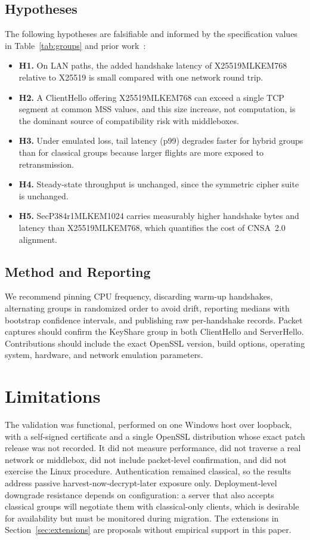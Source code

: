 \documentclass[conference]{IEEEtran}
\begin{document}
\subsection{Hypotheses}
The following hypotheses are falsifiable and informed by the specification values in Table~\ref{tab:groups} and prior work~\cite{paquin2020}:
\begin{itemize}
  \item \textbf{H1.} On LAN paths, the added handshake latency of X25519MLKEM768 relative to X25519 is small compared with one network round trip.
  \item \textbf{H2.} A ClientHello offering X25519MLKEM768 can exceed a single TCP segment at common MSS values, and this size increase, not computation, is the dominant source of compatibility risk with middleboxes.
  \item \textbf{H3.} Under emulated loss, tail latency (p99) degrades faster for hybrid groups than for classical groups because larger flights are more exposed to retransmission.
  \item \textbf{H4.} Steady-state throughput is unchanged, since the symmetric cipher suite is unchanged.
  \item \textbf{H5.} SecP384r1MLKEM1024 carries measurably higher handshake bytes and latency than X25519MLKEM768, which quantifies the cost of CNSA~2.0 alignment.
\end{itemize}

\subsection{Method and Reporting}
We recommend pinning CPU frequency, discarding warm-up handshakes, alternating groups in randomized order to avoid drift, reporting medians with bootstrap confidence intervals, and publishing raw per-handshake records. Packet captures should confirm the KeyShare group in both ClientHello and ServerHello. Contributions should include the exact OpenSSL version, build options, operating system, hardware, and network emulation parameters.

\section{Limitations}
\label{sec:limits}

The validation was functional, performed on one Windows host over loopback, with a self-signed certificate and a single OpenSSL distribution whose exact patch release was not recorded. It did not measure performance, did not traverse a real network or middlebox, did not include packet-level confirmation, and did not exercise the Linux procedure. Authentication remained classical, so the results address passive harvest-now-decrypt-later exposure only. Deployment-level downgrade resistance depends on configuration: a server that also accepts classical groups will negotiate them with classical-only clients, which is desirable for availability but must be monitored during migration. The extensions in Section~\ref{sec:extensions} are proposals without empirical support in this paper.
\end{document}
